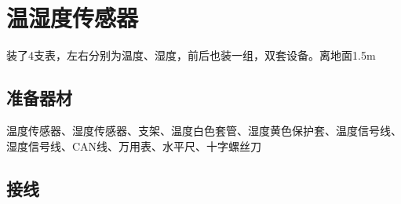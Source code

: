 ﻿\documentclass[UTF8,11pt]{ctexbook}%
\begin{document}
\section{温湿度传感器}

装了4支表，左右分别为温度、湿度，前后也装一组，双套设备。离地面1.5m

\subsection{准备器材}

温度传感器、湿度传感器、支架、温度白色套管、湿度黄色保护套、温度信号线、湿度信号线、CAN线、万用表、水平尺、十字螺丝刀  

\subsection{接线}
\end{document}

